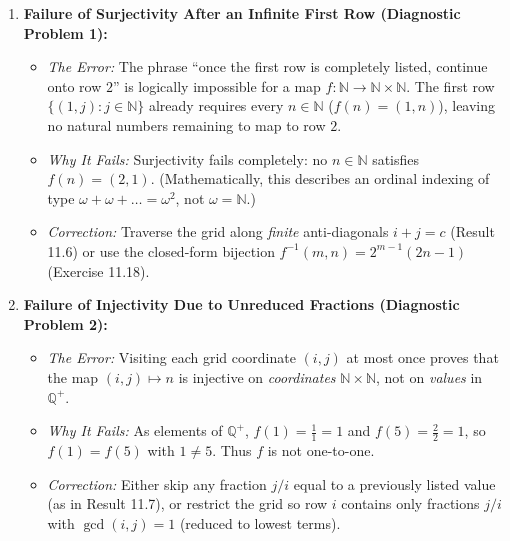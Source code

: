 \documentclass[11pt, letterpaper]{article}
\theoremstyle{definition}
\theoremstyle{remark}
\begin{document}
\begin{enumerate}[label=\textbf{Flaw \arabic*:}]
    \item \textbf{Failure of Surjectivity After an Infinite First Row (Diagnostic Problem 1):}
    \begin{itemize}
        \item \textit{The Error:} The phrase ``once the first row is completely listed, continue onto row $2$'' is logically impossible for a map $f : \mathbb{N} \to \mathbb{N} \times \mathbb{N}$. The first row $\{(1, j) : j \in \mathbb{N}\}$ already requires every $n \in \mathbb{N}$ ($f(n) = (1, n)$), leaving no natural numbers remaining to map to row $2$.
        \item \textit{Why It Fails:} Surjectivity fails completely: no $n \in \mathbb{N}$ satisfies $f(n) = (2, 1)$. (Mathematically, this describes an ordinal indexing of type $\omega + \omega + \dots = \omega^2$, not $\omega = \mathbb{N}$.)
        \item \textit{Correction:} Traverse the grid along \textit{finite} anti-diagonals $i + j = c$ (Result 11.6) or use the closed-form bijection $f^{-1}(m, n) = 2^{m-1}(2n - 1)$ (Exercise 11.18).
    \end{itemize}

    \item \textbf{Failure of Injectivity Due to Unreduced Fractions (Diagnostic Problem 2):}
    \begin{itemize}
        \item \textit{The Error:} Visiting each grid coordinate $(i, j)$ at most once proves that the map $(i, j) \mapsto n$ is injective on \textit{coordinates} $\mathbb{N} \times \mathbb{N}$, not on \textit{values} in $\mathbb{Q}^+$.
        \item \textit{Why It Fails:} As elements of $\mathbb{Q}^+$, $f(1) = \frac{1}{1} = 1$ and $f(5) = \frac{2}{2} = 1$, so $f(1) = f(5)$ with $1 \neq 5$. Thus $f$ is not one-to-one.
        \item \textit{Correction:} Either skip any fraction $j/i$ equal to a previously listed value (as in Result 11.7), or restrict the grid so row $i$ contains only fractions $j/i$ with $\gcd(i, j) = 1$ (reduced to lowest terms).
    \end{itemize}


\end{enumerate}
\end{document}
